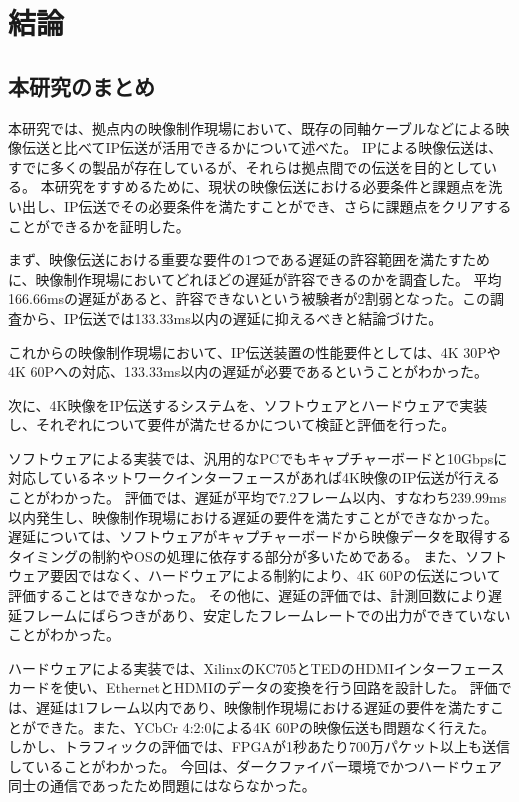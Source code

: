 \chapter{結論}
\label{chap:conclusion}

\section{本研究のまとめ}

本研究では、拠点内の映像制作現場において、既存の同軸ケーブルなどによる映像伝送と比べてIP伝送が活用できるかについて述べた。
IPによる映像伝送は、すでに多くの製品が存在しているが、それらは拠点間での伝送を目的としている。
本研究をすすめるために、現状の映像伝送における必要条件と課題点を洗い出し、IP伝送でその必要条件を満たすことができ、さらに課題点をクリアすることができるかを証明した。

まず、映像伝送における重要な要件の1つである遅延の許容範囲を満たすために、映像制作現場においてどれほどの遅延が許容できるのかを調査した。
平均166.66msの遅延があると、許容できないという被験者が2割弱となった。この調査から、IP伝送では133.33ms以内の遅延に抑えるべきと結論づけた。

これからの映像制作現場において、IP伝送装置の性能要件としては、4K 30Pや4K 60Pへの対応、133.33ms以内の遅延が必要であるということがわかった。

次に、4K映像をIP伝送するシステムを、ソフトウェアとハードウェアで実装し、それぞれについて要件が満たせるかについて検証と評価を行った。

ソフトウェアによる実装では、汎用的なPCでもキャプチャーボードと10Gbpsに対応しているネットワークインターフェースがあれば4K映像のIP伝送が行えることがわかった。
評価では、遅延が平均で7.2フレーム以内、すなわち239.99ms以内発生し、映像制作現場における遅延の要件を満たすことができなかった。
遅延については、ソフトウェアがキャプチャーボードから映像データを取得するタイミングの制約やOSの処理に依存する部分が多いためである。
また、ソフトウェア要因ではなく、ハードウェアによる制約により、4K 60Pの伝送について評価することはできなかった。
その他に、遅延の評価では、計測回数により遅延フレームにばらつきがあり、安定したフレームレートでの出力ができていないことがわかった。

ハードウェアによる実装では、XilinxのKC705とTEDのHDMIインターフェースカードを使い、EthernetとHDMIのデータの変換を行う回路を設計した。
評価では、遅延は1フレーム以内であり、映像制作現場における遅延の要件を満たすことができた。また、YCbCr 4:2:0による4K 60Pの映像伝送も問題なく行えた。
しかし、トラフィックの評価では、FPGAが1秒あたり700万パケット以上も送信していることがわかった。
今回は、ダークファイバー環境でかつハードウェア同士の通信であったため問題にはならなかった。

